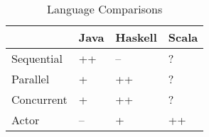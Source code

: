 \begin{table*}[t]
\centering
\caption{Language Comparisons}
\label{tab:language_comparisons}
\begin{tabular}{l || l | l | l  }
	 			& Java 	& Haskell 	& Scala	\\ \hline \hline

Sequential		& ++	& --		& ?		\\  
Parallel		& +		& ++		& ?		\\  
Concurrent		& +		& ++		& ?		\\  
Actor			& --	& +			& ++	\\  

\end{tabular}
\end{table*}